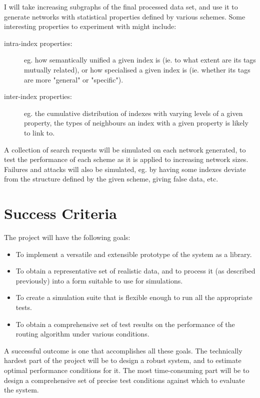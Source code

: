 \documentclass[12pt]{article}
\begin{document}
I will take increasing subgraphs of the final processed data set, and use it to
generate networks with statistical properties defined by various schemes. Some
interesting properties to experiment with might include:

\begin{description}
\item [intra-index properties:] eg. how semantically unified a given index is (ie. to what extent are its tags mutually related), or how specialised a given index is (ie. whether its tags are more "general" or "specific").
\item [inter-index properties:] eg. the cumulative distribution of indexes with varying levels of a given property, the types of neighbours an index with a given property is likely to link to.
\end{description}

A collection of search requests will be simulated on each network generated, to
test the performance of each scheme as it is applied to increasing network
sizes. Failures and attacks will also be simulated, eg. by having some indexes
deviate from the structure defined by the given scheme, giving false data, etc.


\section*{Success Criteria}

The project will have the following goals:

\begin{itemize}
\item To implement a versatile and extensible prototype of the system as a library.
\item To obtain a representative set of realistic data, and to process it (as described previously) into a form suitable to use for simulations.
\item To create a simulation suite that is flexible enough to run all the appropriate tests.
\item To obtain a comprehensive set of test results on the performance of the routing algorithm under various conditions.
\end{itemize}

A successful outcome is one that accomplishes all these goals. The technically
hardest part of the project will be to design a robust system, and to estimate
optimal performance conditions for it. The most time-consuming part will be to
design a comprehensive set of precise test conditions against which to evaluate
the system.
\end{document}
